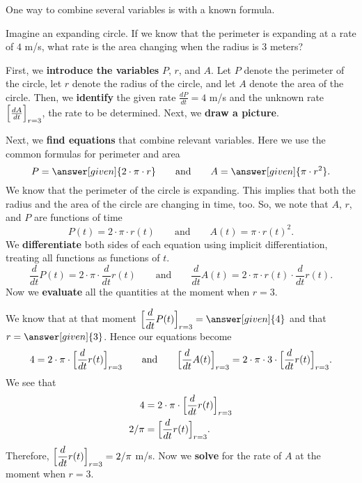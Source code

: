 \documentclass{ximera}
\begin{document}
One way to combine several variables is with a known formula.

\begin{example}
  Imagine an expanding circle. If we know that the perimeter is
  expanding at a rate of $4$ m/s, what rate is the area changing
  when the radius is $3$ meters?
  \begin{explanation}
   First, we \textbf{introduce the variables} $P$, $r$, and $A$. Let $P$ denote the perimeter of the circle, let $r$ denote the radius of the circle, and  let $A$ denote the area of the circle. Then, we \textbf{identify} the given rate $\frac{dP}{dt}=4$ m/s and the unknown rate $\Bigl[\frac{dA}{dt}\Bigr]_{r=3}$, the rate to be determined. 
    Next, we \textbf{draw a picture}.
    \begin{image}
    \end{image}
   Next, we \textbf{find equations} that combine relevant
   variables. Here we use the common formulas for perimeter and area
    \[
    P = \answer[given]{2\cdot \pi \cdot r}
    \qquad\text{and}\qquad
    A = \answer[given]{\pi \cdot r^2}.
    \]
   We know that the perimeter of the circle is expanding. This implies that both the radius and the area of the circle are changing in time, too.
    So, we note that $A$, $r$, and $P$ are functions of time
    \[
    P(t) = 2\cdot \pi \cdot r(t)
    \qquad\text{and}\qquad
    A(t) = \pi \cdot r(t)^2.
    \]
    We \textbf{differentiate} both sides of each equation using implicit
    differentiation, treating all functions as functions of $t$.
    \[
    \dfrac{d}{dt}P(t) = 2\cdot \pi\cdot  \dfrac{d}{dt}r(t)
    \qquad\text{and}\qquad
     \dfrac{d}{dt}A(t) = 2\cdot \pi\cdot r(t) \cdot  \dfrac{d}{dt}r(t).
    \]
    Now we \textbf{evaluate} all the quantities at the moment when $r=3$.
    
     We know  that at that moment $\Bigl[ \dfrac{d}{dt}P(t)\Bigr]_{r=3} =
    \answer[given]{4}$ and that $r = \answer[given]{3}$. Hence our
    equations become
    \[
    4 = 2\cdot \pi\cdot \Bigl[\dfrac{d}{dt}r(t)\Bigr]_{r=3}
    \qquad\text{and}\qquad
   \Bigl[ \dfrac{d}{dt}A(t)\Bigr]_{r=3} = 2\cdot \pi\cdot 3 \cdot \Bigl[\dfrac{d}{dt}r(t)  \Bigl]_{r=3}.
    \]
    We see that
    \begin{align*}
       4 &= 2\cdot \pi\cdot \Bigl[\dfrac{d}{dt}r(t)\Bigr]_{r=3}\\
      2/\pi &=  \Bigl[\dfrac{d}{dt}r(t)\Bigr]_{r=3}.
    \end{align*}
    Therefore, $\Bigl[\dfrac{d}{dt}r(t)\Bigr]_{r=3}= 2/\pi$ m/s.
   Now we \textbf{solve} for the rate of $A$ at the moment  when $r=3$.
   

\end{explanation}
\end{example}
\end{document}
